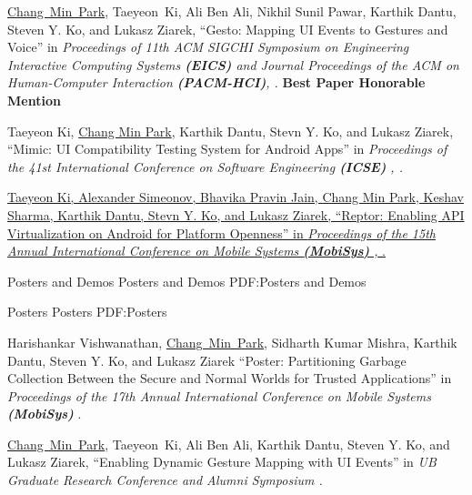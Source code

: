 \documentclass[letterpaper,MMMyyyy,nonstopmode]{simpleresumecv}
\begin{document}
\begin{Body}
\begingroup
\renewcommand{\MaxNumberedItem}{[88]}

\BigGap
\NumberedItem{[1]} 
\underline{Chang~Min~Park}, Taeyeon~Ki, Ali Ben Ali, 
Nikhil Sunil Pawar, Karthik Dantu, Steven Y. Ko, and Lukasz Ziarek, 
``Gesto: Mapping UI Events to Gestures and Voice'' in
\textit{Proceedings of 11th ACM SIGCHI Symposium on Engineering Interactive Computing Systems \textbf{(EICS)}
and \textit{Journal Proceedings of the ACM on Human-Computer Interaction \textbf{(PACM-HCI)}}, .}
\linebreak\textbf{Best Paper Honorable Mention}

\Gap
\NumberedItem{[2]}
Taeyeon Ki, \underline{Chang Min Park}, Karthik Dantu, Stevn Y. Ko, and Lukasz Ziarek, 
``Mimic: UI Compatibility Testing System for Android Apps'' in
\textit{Proceedings of the 41st International Conference on Software Engineering \textbf{(ICSE)}
, .}

\Gap
\NumberedItem{[3]}
\href{https://dl.acm.org/citation.cfm?id=3081341}
{Taeyeon Ki, Alexander Simeonov, Bhavika Pravin Jain, \underline{Chang Min Park},
Keshav Sharma, Karthik Dantu, Stevn Y. Ko, and Lukasz Ziarek, 
``Reptor: Enabling API Virtualization on Android for Platform Openness'' in 
\textit{Proceedings of the 15th Annual International Conference on Mobile Systems \textbf{(MobiSys)}
, }.}





\Section
{Posters and Demos}
{Posters and Demos}
{PDF:Posters and Demos}

\SubSection
{Posters}
{Posters}
{PDF:Posters}

\begingroup
\renewcommand{\MaxNumberedItem}{[88]}

\BigGap
\NumberedItem{[1]}
Harishankar Vishwanathan, \underline{Chang~Min~Park}, Sidharth Kumar Mishra, Karthik Dantu, 
Steven Y. Ko, and Lukasz Ziarek
``Poster: Partitioning Garbage Collection Between the Secure and Normal Worlds for Trusted Applications'' in
\textit{Proceedings of the 17th Annual International Conference on Mobile Systems \textbf{(MobiSys)}
}.

\Gap
\NumberedItem{[2]}
\underline{Chang~Min~Park}, Taeyeon~Ki, Ali Ben Ali, Karthik Dantu, Steven Y. Ko, 
and Lukasz Ziarek, 
``Enabling Dynamic Gesture Mapping with UI Events'' in
\textit{UB Graduate Research Conference and Alumni Symposium
.}



\end{Body}
\end{document}
